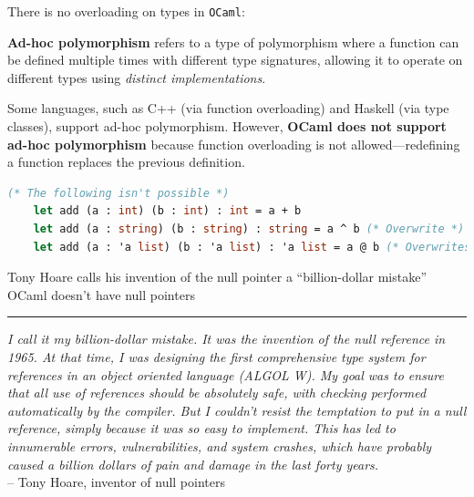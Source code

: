 There is no overloading on types in \texttt{OCaml}:
\begin{Def}

    \textbf{Ad-hoc polymorphism} refers to a type of polymorphism where a function can be defined multiple times with different type signatures, allowing it to operate on different types using \textit{distinct implementations}.

    Some languages, such as C++ (via function overloading) and Haskell (via type classes), support ad-hoc polymorphism. However, \textbf{OCaml does not support ad-hoc polymorphism} because function overloading is not allowed—redefining a function replaces the previous definition.\\
    \begin{lstlisting}[language=OCaml, caption={No Overloading in OCaml}, numbers=none]
    (* The following isn't possible *)
    let add (a : int) (b : int) : int = a + b
    let add (a : string) (b : string) : string = a ^ b (* Overwrite *)
    let add (a : 'a list) (b : 'a list) : 'a list = a @ b (* Overwrites *)
    \end{lstlisting}
\end{Def}

\newpage 

\begin{Tip} Tony Hoare calls his invention of the
null pointer a ``billion-dollar mistake''
OCaml doesn't have null pointers\\
\noindent
\rule{\textwidth}{0.4pt}
\textit{I call it my billion-dollar mistake. It was the invention of the null
reference in 1965. At that time, I was designing the first comprehensive type
system for references in an object oriented language (ALGOL W). My goal was to
ensure that all use of references should be absolutely safe, with checking
performed automatically by the compiler. But I couldn't resist the temptation
to put in a null reference, simply because it was so easy to implement. This
has led to innumerable errors, vulnerabilities, and system crashes, which have
probably caused a billion dollars of pain and damage in the last forty years.}\\
-- Tony Hoare, inventor of null pointers
\end{Tip}


